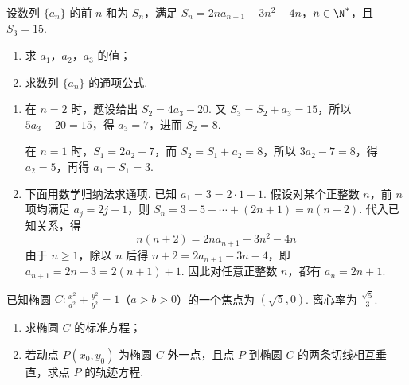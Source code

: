 \begin{problem}
设数列 \(\{a_{n}\}\) 的前 \(n\) 和为 \(S_{n}\)，满足 \(S_{n} = 2na_{n+1} - 3n^{2} - 4n\)，\(n \in \N^*\)，且 \(S_{3} = 15\).

\begin{enumerate}
\item 求 \( a_{1} \)，\( a_{2} \)，\( a_{3} \) 的值；
\item 求数列 \(\{a_{n}\}\) 的通项公式.
\end{enumerate}
\end{problem}

\begin{solution}
\begin{enumerate}
\item
在 \(n=2\) 时，题设给出 \(S_2=4a_3-20\). 又
\(S_3=S_2+a_3=15\)，所以 \(5a_3-20=15\)，得 \(a_3=7\)，进而 \(S_2=8\).

在 \(n=1\) 时，\(S_1=2a_2-7\)，而 \(S_2=S_1+a_2=8\)，所以 \(3a_2-7=8\)，得 \(a_2=5\)，再得 \(a_1=S_1=3\).

\item 下面用数学归纳法求通项. 已知 \(a_1=3=2\cdot1+1\). 假设对某个正整数 \(n\)，前 \(n\) 项均满足 \(a_j=2j+1\)，则
\(S_n=3+5+\cdots+(2n+1)=n(n+2)\). 代入已知关系，得
\[
n(n+2)=2na_{n+1}-3n^2-4n
\]
由于 \(n\geqslant1\)，除以 \(n\) 后得
\(n+2=2a_{n+1}-3n-4\)，即 \(a_{n+1}=2n+3=2(n+1)+1\). 因此对任意正整数 \(n\)，都有
\(a_n=2n+1\).
\end{enumerate}
\end{solution}

\begin{problem}
已知椭圆 \(C: \frac{x^2}{a^2} + \frac{y^2}{b^2} = 1\)（\(a > b > 0\)）的一个焦点为 \((\sqrt{5}, 0)\). 离心率为 \(\frac{\sqrt{5}}{3}\).

\begin{enumerate}
\item 求椭圆 \(C\) 的标准方程；
\item 若动点 \(P(x_0, y_0)\) 为椭圆 \(C\) 外一点，且点 \(P\) 到椭圆 \(C\) 的两条切线相互垂直，求点 \(P\) 的轨迹方程.
\end{enumerate}
\end{problem}

